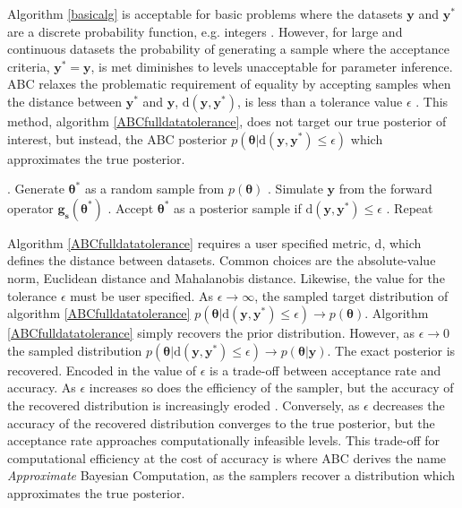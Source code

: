 Algorithm \ref{basicalg} is acceptable for basic problems where the datasets $\bm{y}$ and $\bm{y^*}$ are a discrete probability function, e.g. integers \citep{Tavare1997,Fu1997}. However, for large and continuous datasets the probability of generating a sample where the acceptance criteria, $\bm{y^*} = \bm{y}$, is met diminishes to levels unacceptable for parameter inference. ABC relaxes the problematic requirement of equality by accepting samples when the distance between $\bm{y^*}$ and $\bm{y}$, $\text{d}(\bm{y},\bm{y^*})$, is less than a tolerance value $\epsilon$ \citep{Weiss1998a}. This method, algorithm \ref{ABCfulldatatolerance}, does not target our true posterior of interest, but instead, the ABC posterior $p(\bm{\theta}|\text{d}(\bm{y},\bm{y^*})\leq\epsilon)$ which approximates the true posterior. 

\begin{algorithm}[H]
	\caption{ }
	\begin{algorithmic}
		. Generate $\bm{\theta^*}$ as a random sample from $p(\bm{\theta})$		
		. Simulate $\bm{y}$ from the forward operator $\bm{g_s}(\bm{\theta^*})$		
		. Accept $\bm{\theta^*}$ as a posterior sample if $\text{d}(\bm{y},\bm{y^*})\leq\epsilon$		
		. Repeat
	\end{algorithmic}
	\label{ABCfulldatatolerance}
\end{algorithm}

Algorithm \ref{ABCfulldatatolerance} requires a user specified metric, $\text{d}$, which defines the distance between datasets. Common choices are the absolute-value norm, Euclidean distance and Mahalanobis distance. Likewise, the value for the tolerance $\epsilon$ must be user specified. As $\epsilon \rightarrow \infty$, the sampled target distribution of algorithm \ref{ABCfulldatatolerance} $p(\bm{\theta}|\text{d}(\bm{y},\bm{y^*})\leq\epsilon) \rightarrow p(\bm{\theta})$.  Algorithm \ref{ABCfulldatatolerance} simply recovers the prior distribution. However, as $\epsilon \rightarrow 0$ the sampled distribution $p(\bm{\theta}|\text{d}(\bm{y},\bm{y^*})\leq\epsilon) \rightarrow p(\bm{\theta}|\bm{y})$. The exact posterior is recovered. Encoded in the value of $\epsilon$ is a trade-off between acceptance rate and accuracy. As $\epsilon$ increases so does the efficiency of the sampler, but the accuracy of the recovered distribution is increasingly eroded \citep{Sisson2010a}. Conversely, as $\epsilon$ decreases the accuracy of the recovered distribution converges to the true posterior, but the acceptance rate approaches computationally infeasible levels. This trade-off for computational efficiency at the cost of accuracy is where ABC derives the name \textit{Approximate} Bayesian Computation, as the samplers recover a distribution which approximates the true posterior.\par

